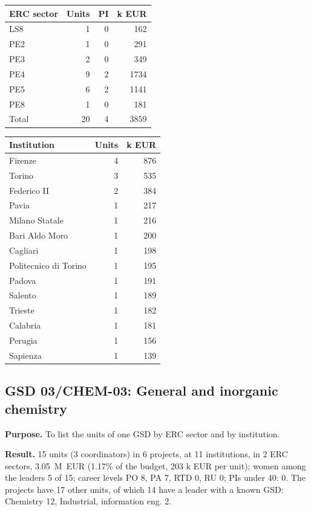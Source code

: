 \documentclass[11pt,a4paper]{article}
\begin{document}
{\footnotesize
\begin{longtable}{lrrr}
\toprule
ERC sector & Units & PI & k EUR \\
\midrule
\endhead
LS8 & 1 & 0 & 162 \\
PE2 & 1 & 0 & 291 \\
PE3 & 2 & 0 & 349 \\
PE4 & 9 & 2 & 1734 \\
PE5 & 6 & 2 & 1141 \\
PE8 & 1 & 0 & 181 \\
\midrule
Total & 20 & 4 & 3859 \\
\bottomrule
\end{longtable}
}
{\footnotesize
\begin{longtable}{lrr}
\toprule
Institution & Units & k EUR \\
\midrule
\endhead
Firenze & 4 & 876 \\
Torino & 3 & 535 \\
Federico II & 2 & 384 \\
Pavia & 1 & 217 \\
Milano Statale & 1 & 216 \\
Bari Aldo Moro & 1 & 200 \\
Cagliari & 1 & 198 \\
Politecnico di Torino & 1 & 195 \\
Padova & 1 & 191 \\
Salento & 1 & 189 \\
Trieste & 1 & 182 \\
Calabria & 1 & 181 \\
Perugia & 1 & 156 \\
Sapienza & 1 & 139 \\
\bottomrule
\end{longtable}
}

\clearpage
\subsection{GSD 03/CHEM-03: General and inorganic chemistry}
\textbf{Purpose.} To list the units of one GSD by ERC sector and by institution.

\textbf{Result.} 15 units (3 coordinators) in 6 projects, at 11 institutions, in 2 ERC sectors, 3.05~M~EUR (1.17\% of the budget, 203 k EUR per unit); women among the leaders 5 of 15; career levels PO 8, PA 7, RTD 0, RU 0; PIs under 40: 0. The projects have 17 other units, of which 14 have a leader with a known GSD: Chemistry 12, Industrial, information eng. 2.
\end{document}
